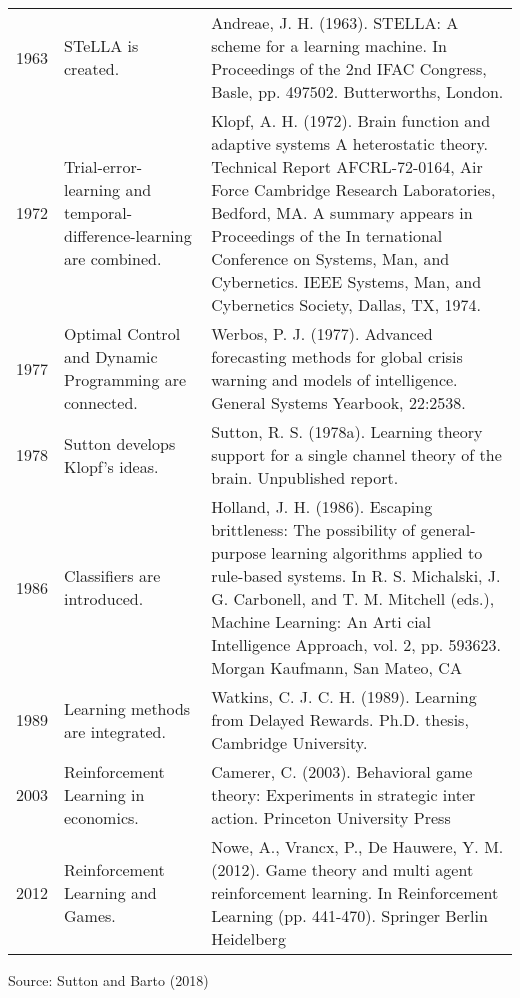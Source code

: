\documentclass[
  letterpaper,
  DIV=11,
  numbers=noendperiod]{scrreprt}
\newenvironment{Shaded}{\begin{snugshade}}{\end{snugshade}}
\newcommand{\AttributeTok}[1]{\textcolor[rgb]{0.40,0.45,0.13}{#1}}
\newcommand{\DecValTok}[1]{\textcolor[rgb]{0.68,0.00,0.00}{#1}}
\newcommand{\DocumentationTok}[1]{\textcolor[rgb]{0.37,0.37,0.37}{\textit{#1}}}
\newcommand{\FunctionTok}[1]{\textcolor[rgb]{0.28,0.35,0.67}{#1}}
\newcommand{\NormalTok}[1]{\textcolor[rgb]{0.00,0.23,0.31}{#1}}
\newcommand{\OtherTok}[1]{\textcolor[rgb]{0.00,0.23,0.31}{#1}}
\newcommand{\SpecialCharTok}[1]{\textcolor[rgb]{0.37,0.37,0.37}{#1}}
\newcommand{\StringTok}[1]{\textcolor[rgb]{0.13,0.47,0.30}{#1}}
\begin{document}
\begin{longtable*}{rll}
{1963} & STeLLA is created. & Andreae, J. H. (1963). STELLA: A scheme for a learning machine. In
 Proceedings of the 2nd IFAC Congress, Basle, pp. 497502. Butterworths,
 London. \\ 
{1972} & Trial-error-learning and temporal-difference-learning are combined. & Klopf, A. H. (1972). Brain function and adaptive systems A heterostatic
 theory. Technical Report AFCRL-72-0164, Air Force Cambridge Research
 Laboratories, Bedford, MA. A summary appears in Proceedings of the In
ternational Conference on Systems, Man, and Cybernetics. IEEE Systems,
 Man, and Cybernetics Society, Dallas, TX, 1974. \\ 
{1977} & Optimal Control and Dynamic Programming are connected. & Werbos, P. J. (1977). Advanced forecasting methods for global crisis warning
 and models of intelligence. General Systems Yearbook, 22:2538. \\ 
{1978} & Sutton develops Klopf's ideas. & Sutton, R. S. (1978a). Learning theory support for a single channel theory of
 the brain. Unpublished report. \\ 
{1986} & Classifiers are introduced. & Holland, J. H. (1986). Escaping brittleness: The possibility of general-purpose
 learning algorithms applied to rule-based systems. In R. S. Michalski,
 J. G. Carbonell, and T. M. Mitchell (eds.), Machine Learning: An Arti cial
 Intelligence Approach, vol. 2, pp. 593623. Morgan Kaufmann, San Mateo,
 CA \\ 
{1989} & Learning methods are integrated. & Watkins, C. J. C. H. (1989). Learning from Delayed Rewards. Ph.D. thesis,
 Cambridge University. \\ 
{2003} & Reinforcement Learning in economics. & Camerer, C. (2003). Behavioral game theory: Experiments in strategic inter
action. Princeton University Press \\ 
{2012} & Reinforcement Learning and Games. & Nowe, A., Vrancx, P., De Hauwere, Y. M. (2012). Game theory and multi
agent reinforcement learning. In Reinforcement Learning (pp. 441-470).
 Springer Berlin Heidelberg \\ 
\bottomrule
\end{longtable*}
\begin{minipage}{\linewidth}
Source: Sutton and Barto (2018)\\
\end{minipage}
\endgroup

\begin{Shaded}
\end{Shaded}
\end{document}

